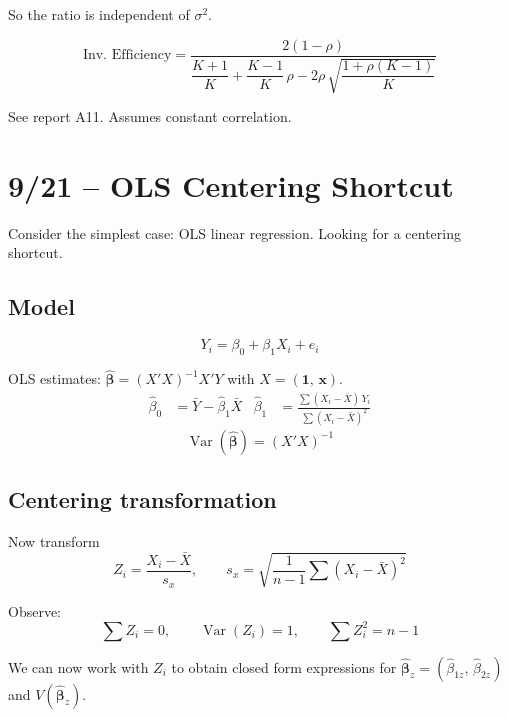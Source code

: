 \documentclass[11pt]{article}
\newcommand{\Var}{\operatorname{Var}}
\begin{document}
So the ratio is independent of $\sigma^2$.

\begin{equation}
  \boxed{
  \text{Inv.\ Efficiency}
  = \frac{2(1-\rho)}
    {\dfrac{K+1}{K}
     + \dfrac{K-1}{K}\,\rho
     - 2\rho\,\sqrt{\dfrac{1+\rho(K-1)}{K}}}
  }
\end{equation}

See report A11. Assumes constant correlation.


\newpage
\section{9/21 -- OLS Centering Shortcut}

Consider the simplest case: OLS linear regression.
Looking for a centering shortcut.

\subsection*{Model}
\begin{equation}
  Y_i = \beta_0 + \beta_1 X_i + e_i
\end{equation}

OLS estimates:
$\hat{\bm{\beta}} = (X'X)^{-1}X'Y$
with $X = (\mathbf{1},\, \mathbf{x})$.
\begin{align}
  \hat{\beta}_0 &= \bar{Y} - \hat{\beta}_1 \bar{X}
  &
  \hat{\beta}_1 &= \frac{\sum(X_i - \bar{X})\,Y_i}
    {\sum(X_i - \bar{X})^2}
\end{align}
\[
  \Var(\hat{\bm{\beta}}) = (X'X)^{-1}
\]

\subsection*{Centering transformation}

Now transform
\[
  Z_i = \frac{X_i - \bar{X}}{s_x}, \qquad
  s_x = \sqrt{\frac{1}{n-1}\sum(X_i - \bar{X})^2}
\]

Observe:
\[
  \sum Z_i = 0, \qquad
  \Var(Z_i) = 1, \qquad
  \sum Z_i^2 = n - 1
\]

We can now work with $Z_i$ to obtain closed form
expressions for
$\hat{\bm{\beta}}_z = (\hat{\beta}_{1z},\,
\hat{\beta}_{2z})$ and $V(\hat{\bm{\beta}}_z)$.
\end{document}
